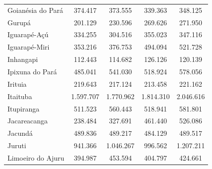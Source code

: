 \begin{table}[!htb]
{\begin{tabular}{l|c|c|c|c}
   Goianésia do Pará      & 374.417    &  373.555  & 339.363   & 348.125   \\
   Gurupá                 & 201.129    &  230.596  & 269.626   & 271.950   \\
   Iguarapé-Açú           & 334.255    &  304.516  & 355.023   & 347.116   \\
   Iguarapé-Miri          & 353.216    &  376.753  & 494.094   & 521.728   \\
   Inhangapi              & 112.443    &  114.682  & 126.126   & 120.139   \\
   Ipixuna do Pará        & 485.041    &  541.030  & 518.924   & 578.056   \\
   Irituia                & 219.643    &  217.124  & 213.458   & 221.162   \\
   Itaituba               & 1.597.707  & 1.770.962 & 1.814.310 & 2.046.616  \\
   Itupiranga             & 511.523    & 560.443   & 518.941   & 581.801   \\
   Jacareacanga           & 238.484    & 327.691   & 461.440   & 526.086   \\
   Jacundá                & 489.836    & 489.217   & 484.129   & 489.517   \\
   Juruti                 & 941.366    & 1.046.267 & 996.562   & 1.207.211   \\
   Limoeiro do Ajuru      & 394.987    & 453.594   & 404.797   & 424.661    \\
\end{tabular}}
\end{table}





